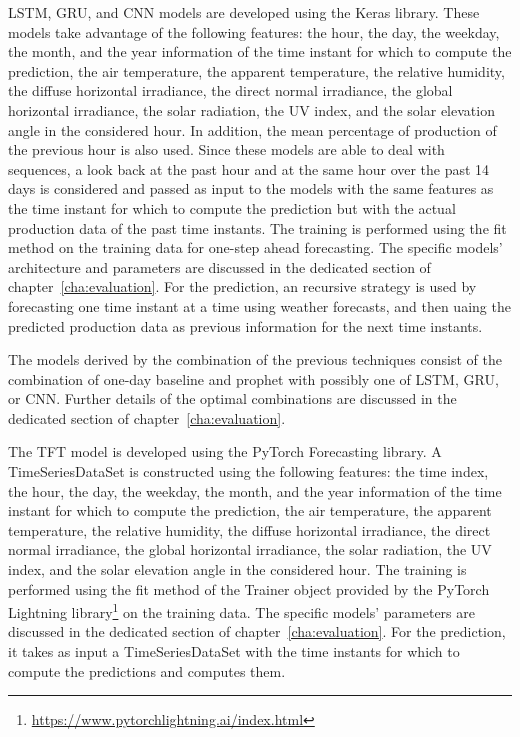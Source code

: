 LSTM, GRU, and CNN models are developed using the Keras library.
These models take advantage of the following features: the hour, the day, the weekday, the month, and the year information of the time instant for which to compute the prediction, the air temperature, the apparent temperature, the relative humidity, the diffuse horizontal irradiance, the direct normal irradiance, the global horizontal irradiance, the solar radiation, the UV index, and the solar elevation angle in the considered hour.
In addition, the mean percentage of production of the previous hour is also used.
Since these models are able to deal with sequences, a look back at the past hour and at the same hour over the past 14 days is considered and passed as input to the models with the same features as the time instant for which to compute the prediction but with the actual production data of the past time instants.
The training is performed using the fit method on the training data for one-step ahead forecasting.
The specific models’ architecture and parameters are discussed in the dedicated section of chapter~\ref{cha:evaluation}.
For the prediction, an recursive strategy is used by forecasting one time instant at a time using weather forecasts, and then uaing the predicted production data as previous information for the next time instants.

The models derived by the combination of the previous techniques consist of the combination of one-day baseline and prophet with possibly one of LSTM, GRU, or CNN.
Further details of the optimal combinations are discussed in the dedicated section of chapter~\ref{cha:evaluation}.

The TFT model is developed using the PyTorch Forecasting library.
A TimeSeriesDataSet is constructed using the following features: the time index, the hour, the day, the weekday, the month, and the year information of the time instant for which to compute the prediction, the air temperature, the apparent temperature, the relative humidity, the diffuse horizontal irradiance, the direct normal irradiance, the global horizontal irradiance, the solar radiation, the UV index, and the solar elevation angle in the considered hour.
The training is performed using the fit method of the Trainer object provided by the PyTorch Lightning library\footnote{ \url{https://www.pytorchlightning.ai/index.html} } on the training data.
The specific models’ parameters are discussed in the dedicated section of chapter~\ref{cha:evaluation}.
For the prediction, it takes as input a TimeSeriesDataSet with the time instants for which to compute the predictions and computes them.

